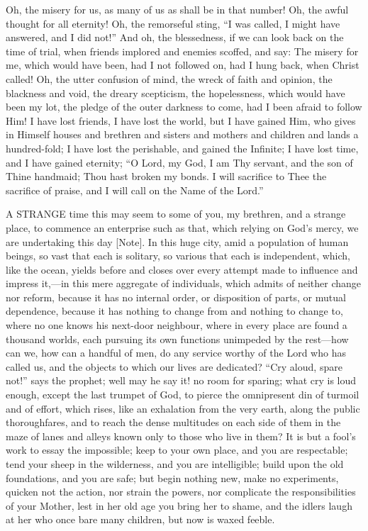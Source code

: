 Oh, the misery for us, as many of us as shall be in that number!
Oh, the awful thought for all eternity! Oh, the remorseful sting,
``I was called, I might have answered, and I did not!'' And
oh, the blessedness, if we can look back on the time of trial, when
friends implored and enemies scoffed, and say: The misery for me,
which would have been, had I not followed on, had I hung back, when
Christ called! Oh, the utter confusion of mind, the wreck of faith and
opinion, the blackness and void, the dreary scepticism, the
hopelessness, which would have been my lot, the pledge of the outer
darkness to come, had I been afraid to follow Him! I have lost
friends, I have lost the world, but I have gained Him, who gives in
Himself houses and brethren and sisters and mothers and children and
lands a hundred-fold; I have lost the perishable, and gained the
Infinite; I have lost time, and I have gained eternity; ``O Lord,
my God, I am Thy servant, and the son of Thine handmaid; Thou hast
broken my bonds. I will sacrifice to Thee the sacrifice of praise, and
I will call on the Name of the Lord.''


A STRANGE time this may seem to some of you, my brethren, and a
strange place, to commence an enterprise such as that, which relying
on God's mercy, we are undertaking this day [Note].
In this huge city, amid a population of human beings, so vast that
each is solitary, so various that each is independent, which, like the
ocean, yields before and closes over every attempt made to influence
and impress it,—in this mere aggregate of individuals, which admits
of neither change nor reform, because it has no internal order, or
disposition of parts, or mutual dependence, because it has nothing to
change from and nothing to change to, where no one knows his next-door
neighbour, where in every place are found a thousand worlds, each
pursuing its own functions unimpeded by the rest—how can we, how can
a handful of men, do any service worthy of the Lord who has called us,
and the objects to which our lives are dedicated? ``Cry aloud,
spare not!'' says the prophet; well may he say it! no room for
sparing; what cry is loud enough, except the last trumpet of God, to
pierce the omnipresent din of turmoil and of effort, which rises, like
an exhalation from the very earth, along the public thoroughfares, and
to reach the dense multitudes on each side of them in the maze of
lanes and alleys known only to those who live in them? It is but a
fool's work to essay the impossible; keep to your own place, and you
are respectable; tend your sheep in the wilderness, and you are
intelligible; build upon the old foundations, and you are safe; but
begin nothing new, make no experiments, quicken not the action, nor
strain the powers, nor complicate the responsibilities of your Mother,
lest in her old age you bring her to shame, and the idlers laugh at
her who once bare many children, but now is waxed feeble.

